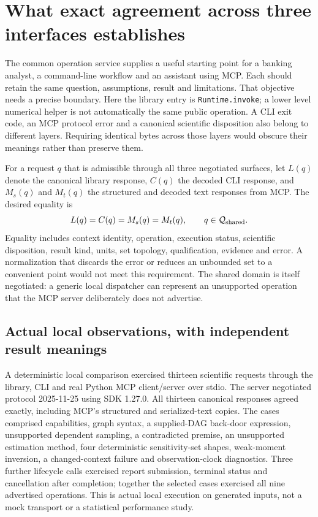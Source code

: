 \section{What exact agreement across three interfaces establishes}
\label{exec16:semantic-parity}

The common operation service supplies a useful starting point for a banking
analyst, a command-line workflow and an assistant using MCP. Each should retain
the same question, assumptions, result and limitations. That objective needs a
precise boundary. Here the library entry is \texttt{Runtime.invoke}; a lower
level numerical helper is not automatically the same public operation. A CLI
exit code, an MCP protocol error and a canonical scientific disposition also
belong to different layers. Requiring identical bytes across those layers
would obscure their meanings rather than preserve them.

For a request $q$ that is admissible through all three negotiated surfaces,
let $L(q)$ denote the canonical library response, $C(q)$ the decoded CLI
response, and $M_s(q)$ and $M_t(q)$ the structured and decoded text responses
from MCP. The desired equality is
\[
 L(q)=C(q)=M_s(q)=M_t(q),\qquad q\in\mathcal Q_{\rm shared}.
\]
Equality includes context identity, operation, execution status, scientific
disposition, result kind, units, set topology, qualification, evidence and
error. A normalization that discards the error or reduces an unbounded set to
a convenient point would not meet this requirement. The shared domain is
itself negotiated: a generic local dispatcher can represent an unsupported
operation that the MCP server deliberately does not advertise.
\citep{exec16_parity_observed,exec16_parity_design}

\subsection{Actual local observations, with independent result meanings}

A deterministic local comparison exercised thirteen scientific requests
through the library, CLI and real Python MCP client/server over stdio. The
server negotiated protocol 2025-11-25 using SDK 1.27.0. All thirteen canonical
responses agreed exactly, including MCP's structured and serialized-text
copies. The cases comprised capabilities, graph syntax, a supplied-DAG
back-door expression, unsupported dependent sampling, a contradicted premise,
an unsupported estimation method, four deterministic sensitivity-set shapes,
weak-moment inversion, a changed-context failure and observation-clock
diagnostics. Three further lifecycle calls exercised report submission,
terminal status and cancellation after completion; together the selected
cases exercised all nine advertised operations. This is actual local execution
on generated inputs, not a mock transport or a statistical performance study.
\citep{exec16_parity_observed}

